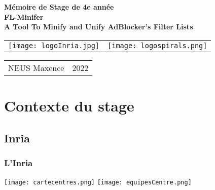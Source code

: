 \documentclass{beamer}
\begin{document}
	
	\begin{frame}
		
		\centering
		\vspace{4em}
		\textbf{Mémoire de Stage de 4e année}\\
		\vspace{2em}
		\textbf{\LARGE FL-Minifer}\\
		\textbf{\large A Tool To Minify and Unify AdBlocker’s Filter Lists}\\
		\vspace{3em}
		
		\begin{tabular}{ c c }
			\texttt{[image: logoInria.jpg]} & \texttt{[image: logospirals.png]}\\
		\end{tabular}
	
		\vspace{4em}
		\begin{tabular}{m{} p{}}
			NEUS Maxence & \hspace{\fill}2022
		\end{tabular}
		
	\end{frame}

	\section{Contexte du stage}
	\subsection{Inria}
	
	\begin{frame}
		\frametitle{L'Inria}
		\centering
		\texttt{[image: cartecentres.png]}
		\texttt{[image: equipesCentre.png]}
	\end{frame}
\end{document}
